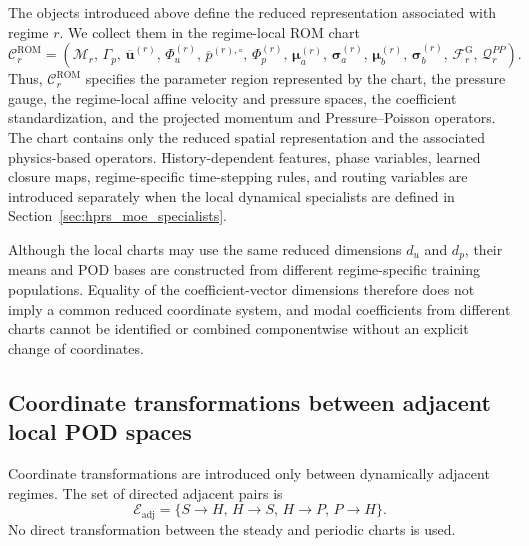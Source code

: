 The objects introduced above define the reduced representation associated
with regime $r$.  We collect them in the regime-local ROM chart
\begin{equation}
  \mathcal{C}^{\mathrm{ROM}}_r
  =
  \left(
    \mathcal{M}_r,\,
    \Gamma_p,\,
    \overline{\boldsymbol{u}}^{(r)},\,
    \Phi_u^{(r)},\,
    \overline{p}^{(r),\circ},\,
    \Phi_p^{(r)},\,
    \boldsymbol{\mu}_a^{(r)},\,
    \boldsymbol{\sigma}_a^{(r)},\,
    \boldsymbol{\mu}_b^{(r)},\,
    \boldsymbol{\sigma}_b^{(r)},\,
    \mathscr{F}^{\mathrm{G}}_r,\,
    \mathscr{Q}^{PP}_r
  \right).
  \label{eq:local_chart_contract}
\end{equation}
Thus, $\mathcal{C}^{\mathrm{ROM}}_r$ specifies the parameter region represented
by the chart, the pressure gauge, the regime-local affine velocity and
pressure spaces, the coefficient standardization, and the projected
momentum and Pressure--Poisson operators.  The chart contains only the
reduced spatial representation and the associated physics-based operators.
History-dependent features, phase variables, learned closure maps,
regime-specific time-stepping rules, and routing variables are introduced
separately when the local dynamical specialists are defined in
Section~\ref{sec:hprs_moe_specialists}.

Although the local charts may use the same reduced dimensions $d_u$ and
$d_p$, their means and POD bases are constructed from different
regime-specific training populations.  Equality of the coefficient-vector
dimensions therefore does not imply a common reduced coordinate system, and
modal coefficients from different charts cannot be identified or combined
componentwise without an explicit change of coordinates.

\subsection{Coordinate transformations between adjacent local POD spaces}
\label{subsec:adjacent_chart_interfaces}

Coordinate transformations are introduced only between dynamically adjacent
regimes.  The set of directed adjacent pairs is
\begin{equation}
  \mathcal{E}_{\mathrm{adj}}
  =
  \{
    S\!\to\!H,\,
    H\!\to\!S,\,
    H\!\to\!P,\,
    P\!\to\!H
  \}.
  \label{eq:adjacent_directed_edges}
\end{equation}
No direct transformation between the steady and periodic charts is used.

